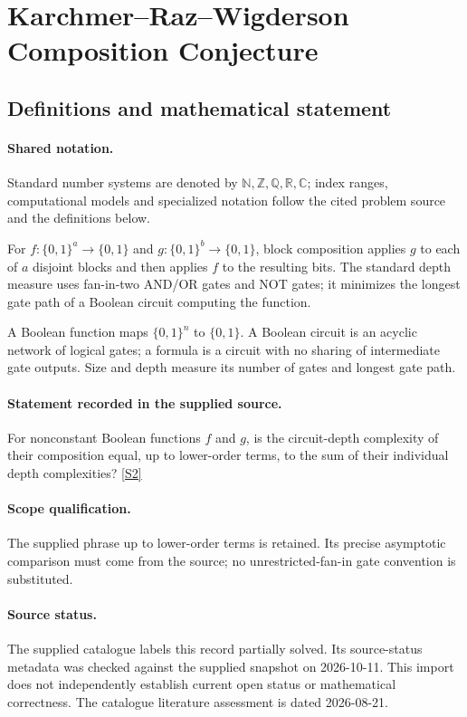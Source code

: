 \documentclass[11pt]{article}
\newcommand{\sref}[2]{\hyperlink{source:#1:#2}{[S#2]}}
\begin{document}
\section{Karchmer–Raz–Wigderson Composition Conjecture}\label{statement}

\subsection{Definitions and mathematical statement}

\paragraph{Shared notation.}Standard number systems are denoted by $\mathbb N,\mathbb Z,\mathbb Q,\mathbb R,\mathbb C$; index ranges, computational models and specialized notation follow the cited problem source and the definitions below.


For $f:\{0,1\}^a\to\{0,1\}$ and $g:\{0,1\}^b\to\{0,1\}$, block composition applies $g$ to each of $a$ disjoint blocks and then applies $f$ to the resulting bits. The standard depth measure uses fan-in-two AND/OR gates and NOT gates; it minimizes the longest gate path of a Boolean circuit computing the function.

A Boolean function maps $\{0,1\}^n$ to $\{0,1\}$. A Boolean circuit is an acyclic network of logical gates; a formula is a circuit with no sharing of intermediate gate outputs. Size and depth measure its number of gates and longest gate path.
\paragraph{Statement recorded in the supplied source.}
For nonconstant Boolean functions $f$ and $g$, is the circuit-depth complexity of their composition equal, up to lower-order terms, to the sum of their individual depth complexities? \sref{statement}{2}
\paragraph{Scope qualification.}
The supplied phrase up to lower-order terms is retained. Its precise asymptotic comparison must come from the source; no unrestricted-fan-in gate convention is substituted.
\paragraph{Source status.}
The supplied catalogue labels this record partially solved. Its source-status metadata was checked against the supplied snapshot on 2026-10-11. This import does not independently establish current open status or mathematical correctness. The catalogue literature assessment is dated 2026-08-21.
\end{document}
